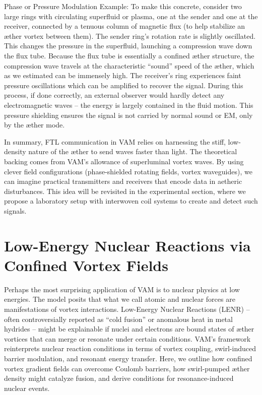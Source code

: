 Phase or Pressure Modulation Example: To make this concrete, consider two large rings with circulating superfluid or plasma, one at the sender and one at the receiver, connected by a tenuous column of magnetic flux (to help stabilize an æther vortex between them). The sender ring’s rotation rate is slightly oscillated. This changes the pressure in the superfluid, launching a compression wave down the flux tube. Because the flux tube is essentially a confined æther structure, the compression wave travels at the characteristic “sound” speed of the æther, which as we estimated can be immensely high. The receiver’s ring experiences faint pressure oscillations which can be amplified to recover the signal. During this process, if done correctly, an external observer would hardly detect any electromagnetic waves – the energy is largely contained in the fluid motion. This pressure shielding ensures the signal is not carried by normal sound or EM, only by the æther mode.


In summary, FTL communication in VAM relies on harnessing the stiff, low-density nature of the æther to send waves faster than light. The theoretical backing comes from VAM’s allowance of superluminal vortex waves. By using clever field configurations (phase-shielded rotating fields, vortex waveguides), we can imagine practical transmitters and receivers that encode data in aetheric disturbances. This idea will be revisited in the experimental section, where we propose a laboratory setup with interwoven coil systems to create and detect such signals.


\section*{Low-Energy Nuclear Reactions via Confined Vortex Fields}

Perhaps the most surprising application of VAM is to nuclear physics at low energies. The model posits that what we call atomic and nuclear forces are manifestations of vortex interactions. Low-Energy Nuclear Reactions (LENR) – often controversially reported as “cold fusion” or anomalous heat in metal hydrides – might be explainable if nuclei and electrons are bound states of æther vortices that can merge or resonate under certain conditions. VAM’s framework reinterprets nuclear reaction conditions in terms of vortex coupling, swirl-induced barrier modulation, and resonant energy transfer. Here, we outline how confined vortex gradient fields can overcome Coulomb barriers, how swirl-pumped æther density might catalyze fusion, and derive conditions for resonance-induced nuclear events.


